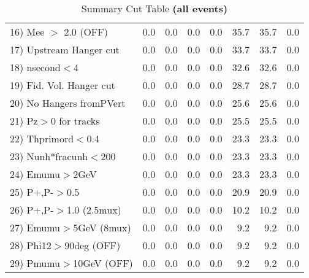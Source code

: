 \begin{table}[h!]
{{\begin{tabular}{||l||r|r|r|r|r||r||r||}
 16) Mee $>$ 2.0  (OFF)   &       0.0 &       0.0 &       0.0 &       0.0 &      35.7 &      35.7 &       0.0 \\
 17) Upstream Hanger cut  &       0.0 &       0.0 &       0.0 &       0.0 &      33.7 &      33.7 &       0.0 \\
 18) nsecond$<$4          &       0.0 &       0.0 &       0.0 &       0.0 &      32.6 &      32.6 &       0.0 \\
 19) Fid. Vol. Hanger cut &       0.0 &       0.0 &       0.0 &       0.0 &      28.7 &      28.7 &       0.0 \\
 20) No Hangers fromPVert &       0.0 &       0.0 &       0.0 &       0.0 &      25.6 &      25.6 &       0.0 \\
 21) Pz$>$0 for tracks    &       0.0 &       0.0 &       0.0 &       0.0 &      25.5 &      25.5 &       0.0 \\
 22) Thprimord$<$0.4      &       0.0 &       0.0 &       0.0 &       0.0 &      23.3 &      23.3 &       0.0 \\
 23) Nunh*fracunh$<$200   &       0.0 &       0.0 &       0.0 &       0.0 &      23.3 &      23.3 &       0.0 \\
 24) Emumu$>$2GeV         &       0.0 &       0.0 &       0.0 &       0.0 &      23.3 &      23.3 &       0.0 \\
 25) P+,P-$>$0.5          &       0.0 &       0.0 &       0.0 &       0.0 &      20.9 &      20.9 &       0.0 \\
 26) P+,P-$>$1.0 (2.5mux) &       0.0 &       0.0 &       0.0 &       0.0 &      10.2 &      10.2 &       0.0 \\
 27) Emumu$>$5GeV  (8mux) &       0.0 &       0.0 &       0.0 &       0.0 &       9.2 &       9.2 &       0.0 \\
 28) Phi12$>$90deg  (OFF) &       0.0 &       0.0 &       0.0 &       0.0 &       9.2 &       9.2 &       0.0 \\
 29) Pmumu$>$10GeV  (OFF) &       0.0 &       0.0 &       0.0 &       0.0 &       9.2 &       9.2 &       0.0 \\
 \hline
 \hline
 \end{tabular}
 \caption{Summary Cut Table \textbf{ (all events)}}
 \label{tab-sumcut}
 }}
 \end{table}
 \endinput
